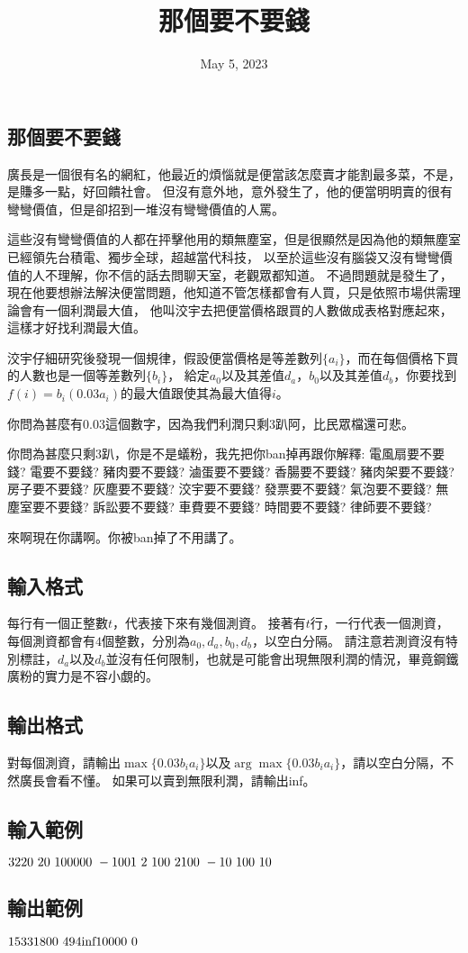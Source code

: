 \documentclass{article}
\title{那個要不要錢}
\date{May 5, 2023}
\begin{document}
\begin{CJK*}{UTF8}{bsmi}

\maketitle

\section*{那個要不要錢}
廣長是一個很有名的網紅，他最近的煩惱就是便當該怎麼賣才能割最多菜，不是，是賺多一點，好回饋社會。
但沒有意外地，意外發生了，他的便當明明賣的很有彎彎價值，但是卻招到一堆沒有彎彎價值的人罵。

這些沒有彎彎價值的人都在抨擊他用的類無塵室，但是很顯然是因為他的類無塵室已經領先台積電、獨步全球，超越當代科技，
以至於這些沒有腦袋又沒有彎彎價值的人不理解，你不信的話去問聊天室，老觀眾都知道。
不過問題就是發生了，現在他要想辦法解決便當問題，他知道不管怎樣都會有人買，只是依照市場供需理論會有一個利潤最大值，
他叫洨宇去把便當價格跟買的人數做成表格對應起來，這樣才好找利潤最大值。

洨宇仔細研究後發現一個規律，假設便當價格是等差數列$\{a_i\}$，而在每個價格下買的人數也是一個等差數列$\{b_i\}$，
給定$a_0$以及其差值$d_a$，$b_0$以及其差值$d_b$，你要找到$f(i)=b_i(0.03a_i)$的最大值跟使其為最大值得$i$。

你問為甚麼有$0.03$這個數字，因為我們利潤只剩$3$趴阿，比民眾檔還可悲。

你問為甚麼只剩$3$趴，你是不是蟻粉，我先把你ban掉再跟你解釋:
電風扇要不要錢? 電要不要錢? 豬肉要不要錢? 滷蛋要不要錢? 香腸要不要錢? 豬肉架要不要錢? 房子要不要錢? 灰塵要不要錢? 
洨宇要不要錢? 發票要不要錢? 氣泡要不要錢? 無塵室要不要錢? 訴訟要不要錢? 車費要不要錢? 時間要不要錢? 律師要不要錢?

來啊現在你講啊。你被ban掉了不用講了。

\subsection*{輸入格式}
每行有一個正整數$t$，代表接下來有幾個測資。
接著有$t$行，一行代表一個測資，每個測資都會有$4$個整數，分別為$a_0,d_a,b_0,d_b$，以空白分隔。
請注意若測資沒有特別標註，$d_a$以及$d_b$並沒有任何限制，也就是可能會出現無限利潤的情況，畢竟鋼鐵廣粉的實力是不容小覷的。

\subsection*{輸出格式}
對每個測資，請輸出$\max\{0.03b_ia_i\}$以及$\arg\max\{0.03b_ia_i\}$，請以空白分隔，不然廣長會看不懂。
如果可以賣到無限利潤，請輸出inf。

\subsection*{輸入範例}
$3\\220\ 20\ 100000\ -100\\1\ 2\ 100\ 2\\100\ -10\ 100\ 10$

\subsection*{輸出範例}
$15331800\ 494\\\text{inf}\\10000\ 0$

\end{CJK*}
\end{document}
